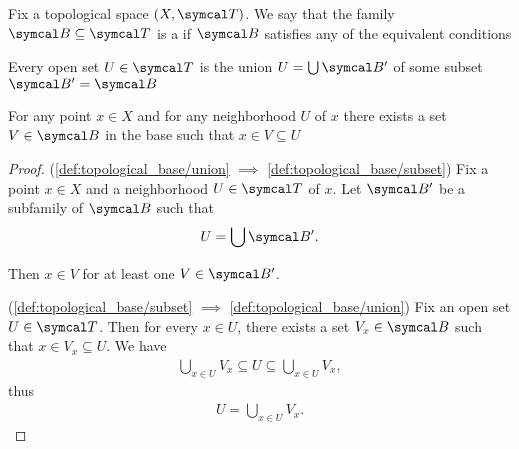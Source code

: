 \begin{definition}\label{def:topological_base}\cite[12]{Engelking1989}
  Fix a topological space $(X, \Cal{T})$. We say that the family $\Cal{B} \subseteq \Cal{T}$ is a  if $\Cal{B}$ satisfies any of the equivalent conditions
  \begin{defenum}
    \item\label{def:topological_base/union} Every open set $U \in \Cal{T}$ is the union $U = \bigcup \Cal{B}'$ of some subset $\Cal{B}' = \Cal{B}$
    \item\label{def:topological_base/subset} For any point $x \in X$ and for any neighborhood $U$ of $x$ there exists a set $V \in \Cal{B}$ in the base such that $x \in V \subseteq U$
  \end{defenum}
\end{definition}
\begin{proof}
  (\ref{def:topological_base/union} $\implies$ \ref{def:topological_base/subset}) Fix a point $x \in X$ and a neighborhood $U \in \Cal{T}$ of $x$. Let $\Cal{B}'$ be a subfamily of $\Cal{B}$ such that
  \begin{align*}
    U = \bigcup \Cal{B}'.
  \end{align*}

  Then $x \in V$ for at least one $V \in \Cal{B}'$.

  (\ref{def:topological_base/subset} $\implies$ \ref{def:topological_base/union}) Fix an open set $U \in \Cal{T}$. Then for every $x \in U$, there exists a set $V_x \in \Cal{B}$ such that $x \in V_x \subseteq U$. We have
  \begin{align*}
    \bigcup_{x \in U} V_x \subseteq U \subseteq \bigcup_{x \in U} V_x,
  \end{align*}
  thus
  \begin{align*}
    U = \bigcup_{x \in U} V_x.
  \end{align*}
\end{proof}

